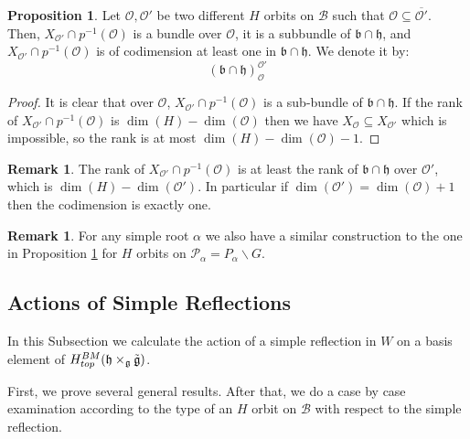 \documentclass[12pt]{article}
\newcommand{\B}{\mathcal{B}}
\newcommand{\s}{\mathcal{O}}
\theoremstyle{plain}
\theoremstyle{definition}
\newtheorem{prop}[theorem]{Proposition}
\newtheorem{Remark}[theorem]{Remark}
\begin{document}
\begin{prop}\label{orbit limit}
    Let $\s,\s'$ be two different $H$ orbits on $\B$ such that $\mathcal{O}\subseteq \overline{\mathcal{O}'}$. Then, $X_{\mathcal{O'}}\cap p^{-1}(\mathcal{O})$ is a bundle over $\mathcal{O}$, it is a subbundle of $\mathfrak{b}\cap\mathfrak{h}$, and $X_{\mathcal{O'}}\cap p^{-1}(\mathcal{O})$ is of codimension at least one in $\mathfrak{b}\cap\mathfrak{h}$. We denote it by:
    $$(\mathfrak{b}\cap\mathfrak{h})^{\s'}_\s$$
    
\end{prop}

\begin{proof}
    It is clear that over $\s$, $X_{\mathcal{O'}}\cap p^{-1}(\mathcal{O})$ is a sub-bundle of $\mathfrak{b}\cap \mathfrak{h}$. If the rank of $X_{\mathcal{O'}}\cap p^{-1}(\mathcal{O})$ is $\dim(H)-\dim(\mathcal{O})$ then we have $X_{\mathcal{O}}\subseteq X_{\mathcal{O}'}$ which is impossible, so the rank is at most $\dim(H)-\dim(\mathcal{O})-1$.
\end{proof}

\begin{Remark}
    The rank of $X_{\mathcal{O'}}\cap p^{-1}(\mathcal{O})$ is at least the rank of $\mathfrak{b}\cap \mathfrak{h}$ over $\mathcal{O}'$, which is $\dim(H)-\dim(\mathcal{O}')$. In particular if $\dim(\mathcal{O}')=\dim(\mathcal{O})+1$ then the codimension is exactly one.
\end{Remark}
\begin{Remark}
For any simple root $\alpha$ we also have a similar construction to the one in Proposition \ref{orbit limit} for $H$ orbits on $\mathcal{P}_\alpha=P_\alpha\backslash G$. 
    
\end{Remark}






\subsection{Actions of Simple Reflections}

In this Subsection we calculate the action of a simple reflection in $W$ on a basis element of $H^{BM}_{top}(\mathfrak{h}\times_{\mathfrak{g}}\Tilde{\mathfrak{g}})$.

First, we prove several general results. After that, we do a case by case examination according to the type of an $H$ orbit on $\B$ with respect to the simple reflection. 
\end{document}
